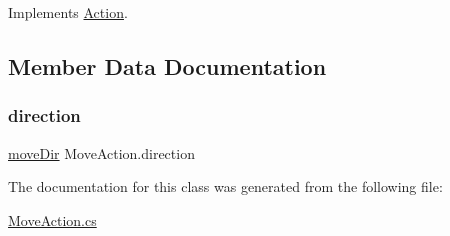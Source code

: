 Implements \mbox{\hyperlink{class_action_a2aedfc3be16448fbf224cb13607de3c0}{Action}}.



\subsection{Member Data Documentation}
\mbox{\label{class_move_action_af0fa977f226987c01b843163799c747a}} 
\subsubsection{\texorpdfstring{direction}{direction}}
{\footnotesize\ttfamily \mbox{\hyperlink{_move_action_8cs_a9e4683fdca765fb08e2d0e5f7f57c162}{move\+Dir}} Move\+Action.\+direction}



The documentation for this class was generated from the following file\+:\begin{DoxyCompactItemize}
\item 
\mbox{\hyperlink{_move_action_8cs}{Move\+Action.\+cs}}\end{DoxyCompactItemize}
